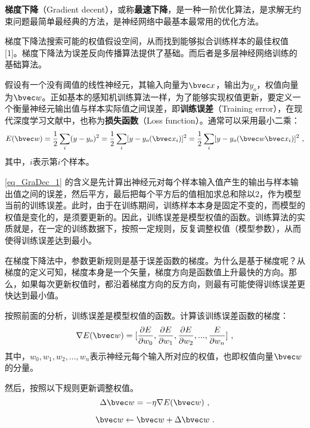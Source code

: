
\textbf{梯度下降}（Gradient decent），或称\textbf{最速下降}，是一种一阶优化算法，是求解无约束问题最简单最经典的方法，是神经网络中最基本最常用的优化方法。

梯度下降法搜索可能的权值假设空间，从而找到能够拟合训练样本的最佳权值 [1]。梯度下降法为误差反向传播算法提供了基础。而后者是多层神经网络训练的基础算法。

假设有一个没有阈值的线性神经元，其输入向量为$\bvec x$，输出为$y_o$，权值向量为$\bvec w$。正如基本的感知机训练算法一样，为了能够实现权值更新，要定义一个衡量神经元输出值与样本实际值之间误差，即\textbf{训练误差}（Training error），在现代深度学习文献中，也称为\textbf{损失函数}（Loss function）。通常可以采用最小二乘：
\begin{equation}\label{eq_GraDec_1}
E(\bvec w)=\frac{1}{2}\sum_i(y-y_o)^2=\frac{1}{2}\sum_i[y-y_o(\bvec x_i)]^2=\frac{1}{2}\sum_i[y-y_o(\bvec w \bvec x_i)]^2~,
\end{equation}
其中，$i$表示第$i$个样本。

\autoref{eq_GraDec_1} 的含义是先计算出神经元对每个样本输入值产生的输出与样本输出值之间的误差，然后平方，最后把每个平方后的值相加求总和除以$2$，作为模型当前的训练误差。此时，由于在训练期间，训练样本本身是固定不变的，而模型的权值是变化的，是须要更新的。因此，训练误差是模型权值的函数。训练算法的实质就是，在一定的训练数据下，按照一定规则，反复调整权值（模型参数），从而使得训练误差达到最小。

在梯度下降法中，参数更新规则是基于误差函数的梯度。为什么是基于梯度呢？从梯度的定义可知，梯度本身是一个矢量，梯度方向是函数值上升最快的方向。那么，如果每次更新权值时，都沿着梯度方向的反方向，则最有可能使得训练误差更快达到最小值。

按照前面的分析，训练误差是模型权值的函数。计算该训练误差函数的梯度：
\begin{equation}
\nabla E(\bvec w)=[\frac{\partial E}{\partial w_0},\frac{ \partial E}{\partial w_1},\frac{\partial E}{\partial w_2},...,\frac{E}{\partial w_n}]~,
\end{equation}
其中，$w_0,w_1,w_2, ..., w_n$表示神经元每个输入所对应的权值，也即权值向量$\bvec w$的分量。

然后，按照以下规则更新调整权值。
\begin{equation}
\Delta \bvec w = - \eta \nabla E(\bvec w)~,
\end{equation}

\begin{equation}
\bvec w \leftarrow \bvec w + \Delta \bvec w~.
\end{equation}

